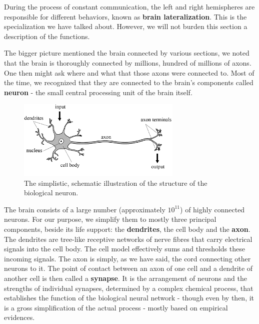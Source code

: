 During the process of constant communication, the left and right hemispheres are responsible for different behaviors, known as \textbf{brain lateralization}. This is the specialization we have talked about. However, we will not burden this section a description of the functions. 

The bigger picture mentioned the brain connected by various sections, we noted that the brain is thoroughly connected by millions, hundred of millions of axons. One then might ask where and what that those axons were connected to. Most of the time, we recognized that they are connected to the brain's components called \textbf{neuron} - the small central processing unit of the brain itself. 

\begin{figure}[h!]
    \centering
    \includegraphics[width=0.7\textwidth]{img/brainneuron1.png}
    \caption{The simplistic, schematic illustration of the structure of the biological neuron.}
\end{figure}

The brain consists of a large number (approximately $10^{11}$) of highly connected neurons. For our purpose, we simplify them to mostly three principal components, beside its life support: the \textbf{dendrites}, the cell body and the \textbf{axon}. The dendrites are tree-like receptive networks of nerve fibres that carry electrical signals into the cell body. The cell model effectively sums and thresholds these incoming signals. The axon is simply, as we have said, the cord connecting other neurons to it. The point of contact between an axon of one cell and a dendrite of another cell is then called a \textbf{synapse}. It is the arrangement of neurons and the strengths of individual synapses, determined by a complex chemical process, that establishes the function of the biological neural network - though even by then, it is a gross simplification of the actual process - mostly based on empirical evidences. 

